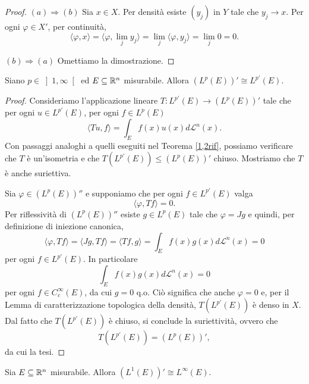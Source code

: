 \begin{proof}\hfill
	\par\noindent
	$(a) \Longrightarrow (b)$ Sia $x \in X$. Per densità esiste $(y_{j})$ in $Y$ tale che $y_{j} \to x$. Per ogni $\varphi \in X'$, per continuità,
	\[ \langle \varphi, x \rangle = \langle \varphi, \lim\limits_{j} y_{j} \rangle = \lim\limits_{j} \langle \varphi,  y_{j} \rangle =  \lim\limits_{j} 0 = 0.\]
	\par\noindent
	$(b) \Longrightarrow (a)$ Omettiamo la dimostrazione.
\end{proof}

\begin{teorema}
	Siano $p \in \left]  1, \infty \right[ $ ed $E \subseteq \mathbb{R}^{n} $ misurabile. Allora $\left( L^{p}(E)\right)' \cong L^{p'}(E)$.
\end{teorema}

\begin{proof}
	Consideriamo l'applicazione lineare $T : L^{p'}(E) \to \left( L^{p}(E)\right)'$ tale che per ogni $u \in L^{p'}(E)$, per ogni $f \in L^{p}(E)$
	\[ \langle Tu,f\rangle = \int_{E}^{} f(x)u(x)d\mathcal{L}^{n}(x).\]
	Con passaggi analoghi a quelli eseguiti nel Teorema \eqref{1,2rif}, possiamo verificare che $T$ è un'isometria e che $T(L^{p'}(E)) \le \left( L^{p}(E)\right)' $ chiuso. Mostriamo che $T$ è anche suriettiva.
	
	Sia $\varphi \in \left( L^{p}(E)\right)'' $ e supponiamo che per ogni $f \in L^{p'}(E)$ valga
	\[ \langle \varphi, Tf \rangle = 0. \]
	Per riflessività di $\left( L^{p}(E)\right)''$ esiste $g \in L^{p}(E)$ tale che $\varphi = Jg$ e quindi, per definizione di iniezione canonica,
	\[ \langle \varphi, Tf \rangle = \langle Jg, Tf \rangle = \langle Tf, g \rangle = \int_{E}^{}f(x)g(x)d\mathcal{L}^{n}(x) = 0 \]
	per ogni $f \in L^{p'}(E)$. In particolare 
	\[ \int_{E}^{}f(x)g(x)d\mathcal{L}^{n}(x) = 0 \]
	per ogni $f \in C^{\infty}_{c}(E)$, da cui $g = 0$ q.o. Ciò significa che anche $\varphi = 0$ e, per il Lemma di caratterizzazione topologica della densità, $T(L^{p'}(E))$ è denso in $X$. Dal fatto che $T(L^{p'}(E))$ è chiuso, si conclude la suriettività, ovvero che
	\[ T(L^{p'}(E)) = \left( L^{p}(E)\right)', \]
	da cui la tesi.
\end{proof}

\begin{teorema}\label{dualediL1}
	Sia $E \subseteq \mathbb{R}^{n} $ misurabile. Allora $\left( L^{1}(E)\right)' \cong L^{\infty}(E)$.
\end{teorema}

